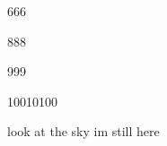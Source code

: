 \documentclass{article}
\begin{document}
666

888

999

10010100

look at the sky im still here
\end{document}
